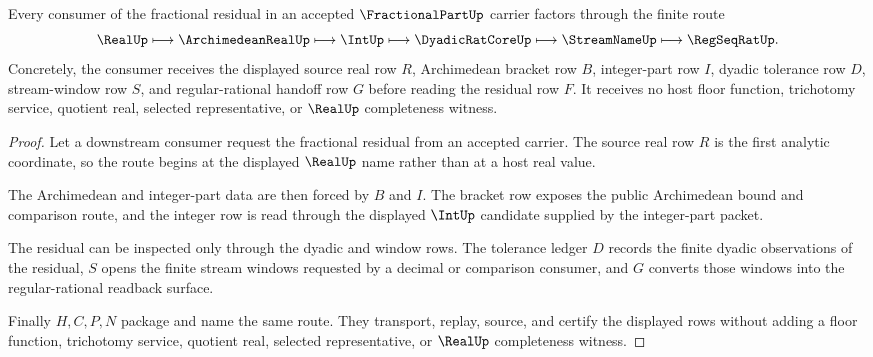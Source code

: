 \begin{theorem}
\label{thm:fractional-part-real-int-handoff}
Every consumer of the fractional residual in an accepted $\FractionalPartUp$ carrier factors through the finite route
$$
\RealUp \longmapsto \ArchimedeanRealUp \longmapsto \IntUp \longmapsto \DyadicRatCoreUp \longmapsto \StreamNameUp \longmapsto \RegSeqRatUp .
$$
Concretely, the consumer receives the displayed source real row $R$, Archimedean bracket row $B$, integer-part row $I$, dyadic tolerance row $D$, stream-window row $S$, and regular-rational handoff row $G$ before reading the residual row $F$. It receives no host floor function, trichotomy service, quotient real, selected representative, or $\RealUp$ completeness witness.
\end{theorem}
\begin{proof}
Let a downstream consumer request the fractional residual from an accepted carrier. The source real row $R$ is the first analytic coordinate, so the route begins at the displayed $\RealUp$ name rather than at a host real value.

The Archimedean and integer-part data are then forced by $B$ and $I$. The bracket row exposes the public Archimedean bound and comparison route, and the integer row is read through the displayed $\IntUp$ candidate supplied by the integer-part packet.

The residual can be inspected only through the dyadic and window rows. The tolerance ledger $D$ records the finite dyadic observations of the residual, $S$ opens the finite stream windows requested by a decimal or comparison consumer, and $G$ converts those windows into the regular-rational readback surface.

Finally $H,C,P,N$ package and name the same route. They transport, replay, source, and certify the displayed rows without adding a floor function, trichotomy service, quotient real, selected representative, or $\RealUp$ completeness witness.
\end{proof}


